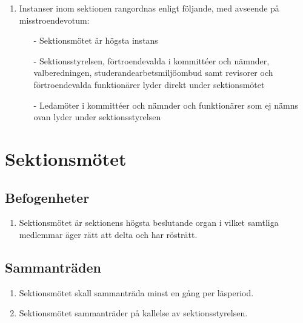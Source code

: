 \documentclass[11pt,a4paper]{article}
\begin{document}
\begin{enumerate}[\thesubsection .1]
	\item \label{rangordning} Instanser inom sektionen rangordnas enligt följande, med avseende på misstroendevotum:


		\begin{itemize}
			\item[-] Sektionsmötet är högsta instans
			\item[-] Sektionsstyrelsen, förtroendevalda i kommittéer och nämnder, valberedningen, studerandearbetsmiljöombud samt revisorer och förtroendevalda funktionärer lyder direkt under sektionsmötet
			\item[-] Ledamöter i kommittéer och nämnder och funktionärer som ej nämns ovan lyder under sektionsstyrelsen
		\end{itemize}
	
\end{enumerate}

\newpage



\section{Sektionsmötet}

\subsection{Befogenheter}

\begin{enumerate}[\thesubsection .1]

  \item Sektionsmötet är sektionens högsta beslutande organ i vilket
  samtliga medlemmar äger rätt att delta och har rösträtt.

\end{enumerate}

\subsection{Sammanträden}

\begin{enumerate}[\thesubsection .1]

  \item Sektionsmötet skall sammanträda minst en gång per läsperiod.

  \item Sektionsmötet sammanträder på kallelse av sektionsstyrelsen.

\end{enumerate}
\end{document}
